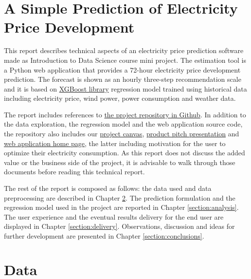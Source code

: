 \documentclass{article}
\begin{document}


\tableofcontents

\vspace{30.0 cm}

\section{A Simple Prediction of Electricity Price Development}
\label{section:introduction}

This report describes technical aspects of an electricity price prediction software made as Introduction to Data Science course mini project. The estimation tool is a Python web application that provides a 72-hour electricity price development prediction. The forecast is shown as an hourly three-step recommendation scale and it is based on \href{https://xgboost.ai/}{XGBoost library} regression model trained using historical data including electricity price, wind power, power consumption and weather data.

The report includes references to \href{https://github.com/IDS-mini/electricity}{the project repository in Github}. In addition to the data exploration, the regression model and the web application source code, the repository also includes our \href{https://github.com/IDS-mini/electricity/blob/main/marketing/Mini-Project-Canvas-Hedlund-Korpi-Ranta.pdf}{project canvas}, \href{https://github.com/IDS-mini/electricity/blob/main/marketing/presentation.pptx}{product pitch presentation} and \href{https://github.com/IDS-mini/electricity/blob/main/src/app/templates/index.html}{web application home page}, the latter including motivation for the user to optimize their electricity consumption. As this report does not discuss the added value or the business side of the project, it is advisable to walk through those documents before reading this technical report.

The rest of the report is composed as follows: the data used and data preprocessing are described in Chapter \ref{section:data}. The prediction formulation and the regression model used in the project are reported in Chapter \ref{section:analysis}. The user experience and the eventual results delivery for the end user are displayed in Chapter \ref{section:delivery}. Observations, discussion and ideas for further development are presented in Chapter \ref{section:conclusions}.

\section{Data}
\label{section:data}
\end{document}
